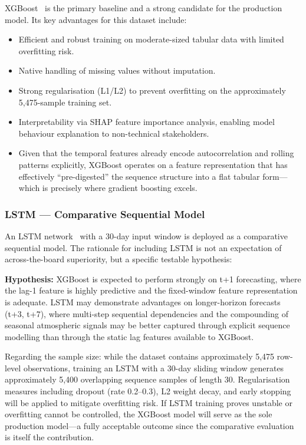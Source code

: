 \documentclass[12pt,a4paper]{report}
\begin{document}
XGBoost~\cite{chen2016xgboost} is the primary baseline and a strong candidate for the production model. Its key advantages for this dataset include:
\begin{itemize}
  \item Efficient and robust training on moderate-sized tabular data with limited overfitting risk.
  \item Native handling of missing values without imputation.
  \item Strong regularisation (L1/L2) to prevent overfitting on the approximately 5,475-sample training set.
  \item Interpretability via SHAP feature importance analysis, enabling model behaviour explanation to non-technical stakeholders.
  \item Given that the temporal features already encode autocorrelation and rolling patterns explicitly, XGBoost operates on a feature representation that has effectively ``pre-digested'' the sequence structure into a flat tabular form---which is precisely where gradient boosting excels.
\end{itemize}

\subsubsection{LSTM --- Comparative Sequential Model}

An LSTM network~\cite{hochreiter1997lstm} with a 30-day input window is deployed as a comparative sequential model. The rationale for including LSTM is not an expectation of across-the-board superiority, but a specific testable hypothesis:

\textbf{Hypothesis:} XGBoost is expected to perform strongly on t+1 forecasting, where the lag-1 feature is highly predictive and the fixed-window feature representation is adequate. LSTM may demonstrate advantages on longer-horizon forecasts (t+3, t+7), where multi-step sequential dependencies and the compounding of seasonal atmospheric signals may be better captured through explicit sequence modelling than through the static lag features available to XGBoost.

Regarding the sample size: while the dataset contains approximately 5,475 row-level observations, training an LSTM with a 30-day sliding window generates approximately 5,400 overlapping sequence samples of length 30. Regularisation measures including dropout (rate 0.2--0.3), L2 weight decay, and early stopping will be applied to mitigate overfitting risk. If LSTM training proves unstable or overfitting cannot be controlled, the XGBoost model will serve as the sole production model---a fully acceptable outcome since the comparative evaluation is itself the contribution.
\end{document}
